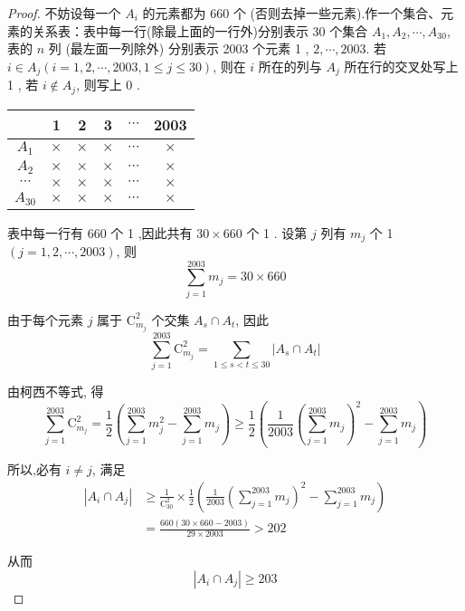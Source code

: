 \begin{proof}
	不妨设每一个 $A_{i}$ 的元素都为 660 个 (否则去掉一些元素).作一个集合、元素的关系表：表中每一行(除最上面的一行外)分别表示 30 个集合 $A_{1}, A_{2}, \cdots, A_{30}$, 表的 $n$ 列 (最左面一列除外) 分别表示 2003 个元素 1 , $2, \cdots, 2003$. 若 $i \in A_{j}(i=1,2, \cdots, 2003,1 \leqslant j \leqslant 30)$, 则在 $i$ 所在的列与 $A_{j}$ 所在行的交叉处写上 1 , 若 $i \notin A_{j}$, 则写上 0 .

	\begin{center}
		\begin{tabular}{c|ccccc}
			         & 1        & 2        & 3        & $\cdots$ & 2003     \\
			\hline
			$A_{1}$  & $\times$ & $\times$ & $\times$ & $\cdots$ & $\times$ \\
			$A_{2}$  & $\times$ & $\times$ & $\times$ & $\cdots$ & $\times$ \\
			$\cdots$ & $\times$ & $\times$ & $\times$ & $\cdots$ & $\times$ \\
			$A_{30}$ & $\times$ & $\times$ & $\times$ & $\cdots$ & $\times$ \\
		\end{tabular}
	\end{center}

	表中每一行有 660 个 1 ,因此共有 $30 \times 660$ 个 1 . 设第 $j$ 列有 $m_{j}$ 个 1 $(j=1,2, \cdots, 2003)$, 则
	$$
		\sum_{j=1}^{2003} m_{j}=30 \times 660
	$$

	由于每个元素 $j$ 属于 $\mathrm{C}_{m_{j}}^{2}$ 个交集 $A_{s} \cap A_{t}$, 因此
	$$
		\sum_{j=1}^{2003} \mathrm{C}_{m_{j}}^{2}=\sum_{1 \leqslant s<t \leqslant 30}\left|A_{s} \cap A_{t}\right|
	$$

	由柯西不等式, 得
	$$
		\sum_{j=1}^{2003} \mathrm{C}_{m_{j}}^{2}=\frac{1}{2}\left(\sum_{j=1}^{2003} m_{j}^{2}-\sum_{j=1}^{2003} m_{j}\right) \geqslant \frac{1}{2}\left(\frac{1}{2003}\left(\sum_{j=1}^{2003} m_{j}\right)^{2}-\sum_{j=1}^{2003} m_{j}\right)
	$$

	所以,必有 $i \neq j$, 满足
	$$
		\begin{aligned}
			\left|A_{i} \cap A_{j}\right| & \geqslant \frac{1}{\mathrm{C}_{30}^{2}} \times \frac{1}{2}\left(\frac{1}{2003}\left(\sum_{j=1}^{2003} m_{j}\right)^{2}-\sum_{j=1}^{2003} m_{j}\right) \\
			                              & =\frac{660(30 \times 660-2003)}{29 \times 2003}>202
		\end{aligned}
	$$

	从而
	$$
		\left|A_{i} \cap A_{j}\right| \geqslant 203
	$$
\end{proof}

